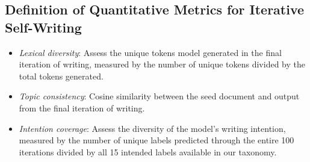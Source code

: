 \subsection{Definition of Quantitative Metrics for Iterative Self-Writing}

\begin{itemize}
    \item \textit{Lexical diversity}: Assess the unique tokens model generated in the final iteration of writing, measured by the number of unique tokens divided by the total tokens generated. 
    \item \textit{Topic consistency}: Cosine similarity between the seed document and output from the final iteration of writing. 
    \item \textit{Intention coverage}: Assess the diversity of the model's writing intention, measured by the number of unique labels predicted through the entire 100 iterations divided by all 15 intended labels available in our taxonomy.
\end{itemize}



